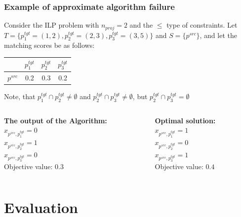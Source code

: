\documentclass{beamer}
\newcommand{\src}[1]{#1^{src}}
\newcommand{\tgt}[1]{#1^{tgt}}
\begin{document}
\begin{frame}
  \frametitle{Example of approximate algorithm failure}

  Consider the ILP problem with \( n_{proj} = 2 \) and the \( \leq \)
  type of constraints.
  Let \( T = \{ \tgt{p_1} = (1, 2), \tgt{p_2} = (2, 3), \tgt{p_3} = (3, 5) \} \)
  and \( S = \{ \src{p} \} \), and let the matching scores be as follows:
  \begin{table}
    \begin{tabular}{cccc}
      & $ \tgt{p_1} $ & $ \tgt{p_2} $  & $\tgt{p_3}$ \\
      \toprule
      $ \src{p} $ & 0.2 & 0.3 & 0.2 \\
    \end{tabular}
  \end{table}
  Note, that \( \tgt{p_1} \cap \tgt{p_2} \neq \emptyset \) and \( \tgt{p_2} \cap \tgt{p_3} \neq \emptyset \), but \( \tgt{p_2} \cap \tgt{p_3} = \emptyset \)
  \vspace*{0.2cm}
  \begin{columns}
    \hspace*{0.1cm}
    \begin{column}[t]{0.5\textwidth}
      \textbf{The output of the Algorithm:} \\
      \( x_{\src{p}, \tgt{p_1}} = 0 \) \\
      \( x_{\src{p}, \tgt{p_2}} = 1 \) \\
      \( x_{\src{p}, \tgt{p_3}} = 0 \) \\
      \vspace*{0.2cm}
      Objective value: \( 0.3 \)
    \end{column}
    \begin{column}[t]{0.5\textwidth}
      \textbf{Optimal solution:} \\
      \( x_{\src{p}, \tgt{p_1}} = 1 \) \\
      \( x_{\src{p}, \tgt{p_2}} = 0 \) \\
      \( x_{\src{p}, \tgt{p_3}} = 1 \) \\
      \vspace*{0.2cm}
      Objective value: \( 0.4 \)
    \end{column}
  \end{columns}
\end{frame}

\section{Evaluation}
\end{document}
